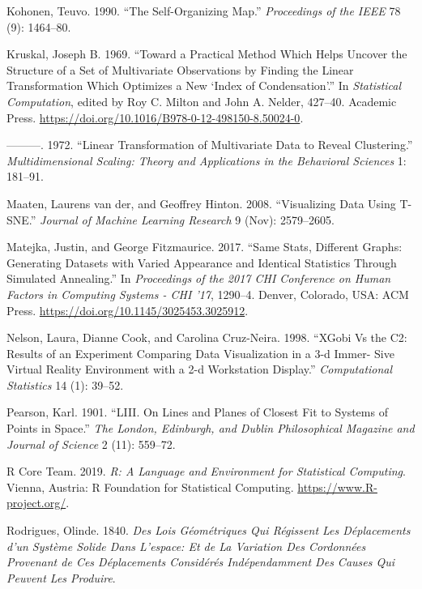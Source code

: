 \documentclass[
  11,
]{article}
\begin{document}
\leavevmode\hypertarget{ref-kohonen_self-organizing_1990}{}%
Kohonen, Teuvo. 1990. ``The Self-Organizing Map.'' \emph{Proceedings of the IEEE} 78 (9): 1464--80.

\leavevmode\hypertarget{ref-kruskal_toward_1969}{}%
Kruskal, Joseph B. 1969. ``Toward a Practical Method Which Helps Uncover the Structure of a Set of Multivariate Observations by Finding the Linear Transformation Which Optimizes a New `Index of Condensation'.'' In \emph{Statistical Computation}, edited by Roy C. Milton and John A. Nelder, 427--40. Academic Press. \url{https://doi.org/10.1016/B978-0-12-498150-8.50024-0}.

\leavevmode\hypertarget{ref-kruskal_linear_1972}{}%
---------. 1972. ``Linear Transformation of Multivariate Data to Reveal Clustering.'' \emph{Multidimensional Scaling: Theory and Applications in the Behavioral Sciences} 1: 181--91.

\leavevmode\hypertarget{ref-maaten_visualizing_2008}{}%
Maaten, Laurens van der, and Geoffrey Hinton. 2008. ``Visualizing Data Using T-SNE.'' \emph{Journal of Machine Learning Research} 9 (Nov): 2579--2605.

\leavevmode\hypertarget{ref-matejka_same_2017}{}%
Matejka, Justin, and George Fitzmaurice. 2017. ``Same Stats, Different Graphs: Generating Datasets with Varied Appearance and Identical Statistics Through Simulated Annealing.'' In \emph{Proceedings of the 2017 CHI Conference on Human Factors in Computing Systems - CHI '17}, 1290--4. Denver, Colorado, USA: ACM Press. \url{https://doi.org/10.1145/3025453.3025912}.

\leavevmode\hypertarget{ref-nelson_xgobi_1998}{}%
Nelson, Laura, Dianne Cook, and Carolina Cruz-Neira. 1998. ``XGobi Vs the C2: Results of an Experiment Comparing Data Visualization in a 3-d Immer- Sive Virtual Reality Environment with a 2-d Workstation Display.'' \emph{Computational Statistics} 14 (1): 39--52.

\leavevmode\hypertarget{ref-pearson_liii._1901}{}%
Pearson, Karl. 1901. ``LIII. On Lines and Planes of Closest Fit to Systems of Points in Space.'' \emph{The London, Edinburgh, and Dublin Philosophical Magazine and Journal of Science} 2 (11): 559--72.

\leavevmode\hypertarget{ref-r_core_team_r:_2019}{}%
R Core Team. 2019. \emph{R: A Language and Environment for Statistical Computing}. Vienna, Austria: R Foundation for Statistical Computing. \url{https://www.R-project.org/}.

\leavevmode\hypertarget{ref-rodrigues_lois_1840}{}%
Rodrigues, Olinde. 1840. \emph{Des Lois Géométriques Qui Régissent Les Déplacements d'un Système Solide Dans L'espace: Et de La Variation Des Cordonnées Provenant de Ces Déplacements Considérés Indépendamment Des Causes Qui Peuvent Les Produire}.
\end{document}
